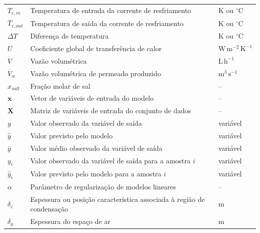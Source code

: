 \begin{longtable}{>{\raggedright\arraybackslash}p{3cm}
                  >{\raggedright\arraybackslash}p{9.5cm}
                  >{\raggedright\arraybackslash}p{3cm}}
$T_{c,in}$ & Temperatura de entrada da corrente de resfriamento & $\mathrm{K}$ ou $^\circ\mathrm{C}$ \\

$T_{c,out}$ & Temperatura de saída da corrente de resfriamento & $\mathrm{K}$ ou $^\circ\mathrm{C}$ \\

$\Delta T$ & Diferença de temperatura & $\mathrm{K}$ ou $^\circ\mathrm{C}$ \\

$U$ & Coeficiente global de transferência de calor & $\mathrm{W\,m^{-2}\,K^{-1}}$ \\

$\dot{V}$ & Vazão volumétrica & $\mathrm{L\,h^{-1}}$ \\

$\dot{V}_w$ & Vazão volumétrica de permeado produzido & $\mathrm{m^3\,s^{-1}}$ \\

$x_{salt}$ & Fração molar de sal & -- \\

$\mathbf{x}$ & Vetor de variáveis de entrada do modelo & -- \\

$\mathbf{X}$ & Matriz de variáveis de entrada do conjunto de dados & -- \\

$y$ & Valor observado da variável de saída & variável \\

$\hat{y}$ & Valor previsto pelo modelo & variável \\

$\bar{y}$ & Valor médio observado da variável de saída & variável \\

$y_i$ & Valor observado da variável de saída para a amostra $i$ & variável \\

$\hat{y}_i$ & Valor previsto pelo modelo para a amostra $i$ & variável \\

$\alpha$ & Parâmetro de regularização de modelos lineares & -- \\

$\delta_c$ & Espessura ou posição característica associada à região de condensação & $\mathrm{m}$ \\

$\delta_g$ & Espessura do espaço de ar & $\mathrm{m}$ \\


\end{longtable}
